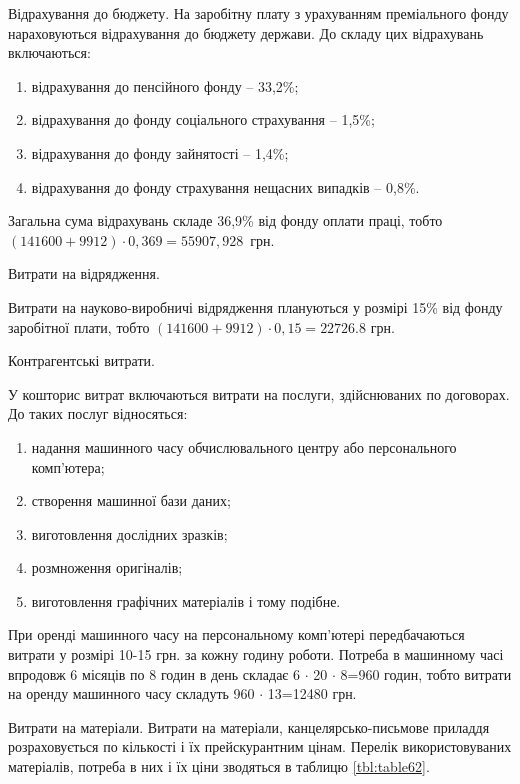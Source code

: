Відрахування до бюджету. 
На заробітну плату з урахуванням преміального фонду нараховуються відрахування до бюджету держави. До складу цих відрахувань включаються:
\begin{enumerate}
\item відрахування до пенсійного фонду – 33,2\%;
\item відрахування до фонду соціального страхування – 1,5\%;
\item відрахування до фонду зайнятості – 1,4\%;
\item відрахування до фонду страхування нещасних випадків – 0,8\%.
\end{enumerate}

Загальна сума відрахувань складе 36,9\% від фонду оплати праці, тобто \mbox{$(141600+9912)  \cdot  0,369 = 55907,928$ грн}.

Витрати на відрядження.

Витрати на науково-виробничі відрядження плануються у розмірі 15\% від фонду заробітної плати, тобто \mbox{$(141600+9912)  \cdot  0,15 = 22726.8$} грн.

Контрагентські витрати.

У кошторис витрат включаються витрати на послуги, здійснюваних по договорах. До таких послуг відносяться:
\begin{enumerate}
\item надання машинного часу обчислювального центру або персонального комп'ютера;
\item створення машинної бази даних;
\item виготовлення дослідних зразків;
\item розмноження оригіналів;
\item виготовлення графічних матеріалів і тому подібне.
\end{enumerate}

При оренді машинного часу на персональному комп'ютері передбачаються витрати у розмірі 10-15 грн. за кожну годину роботи. Потреба в машинному часі впродовж 6 місяців по 8 годин в день складає 6 $ \cdot $ 20 $ \cdot $ 8=960 годин, тобто витрати на оренду машинного часу складуть 960 $ \cdot $ 13=12480 грн.

Витрати на матеріали. Витрати на матеріали, канцелярсько-письмове приладдя розраховується по кількості і їх прейскурантним цінам. Перелік використовуваних матеріалів, потреба в них і їх ціни зводяться в таблицю \ref{tbl:table62}.

